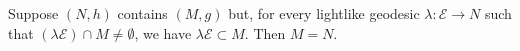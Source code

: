 Suppose $(N, h)$ contains $(M, g)$ but, for every lightlike geodesic $\lambda: \mathcal{E} \to N$ such that $(\lambda \mathcal{E}) \cap M \neq \emptyset$, we have $\lambda \mathcal{E} \subset M$. Then $M = N$.
